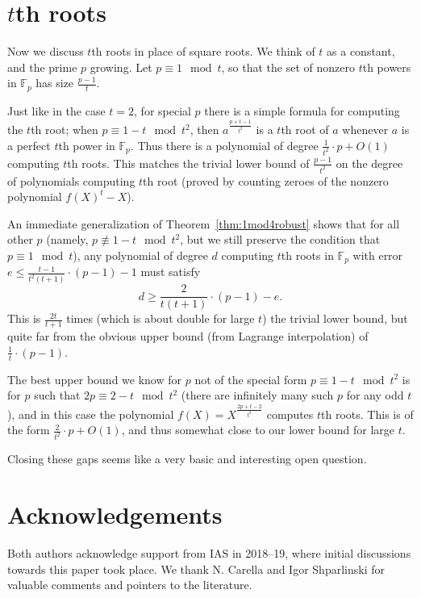 \documentclass{article}
\newcommand{\F}{\mathbb{F}}
\begin{document}
\section{$t$th roots}

Now we discuss $t$th roots in place of square roots. We think of $t$ as a constant, and the prime $p$ growing. Let $p \equiv 1 \mod t$, so that the set of nonzero $t$th powers in $\F_p$ has size $\frac{p-1}{t}$.

Just like in the case $t = 2$, for special $p$ there is a simple formula for computing the $t$th root; when $p \equiv 1-t \mod t^2$, then $a^{\frac{p + t - 1}{t^2}}$ is a $t$th root of $a$ whenever $a$ is a perfect $t$th power in $\F_p$. Thus there is a polynomial of degree $\frac{1}{t^2}\cdot p + O(1)$ computing $t$th roots.
This matches the trivial lower bound of $\frac{p-1}{t^2}$ on the degree of polynomials computing $t$th root (proved by counting zeroes of the nonzero polynomial $f(X)^t - X$).



An immediate generalization of Theorem~\ref{thm:1mod4robust} shows that for all other $p$ (namely, $p \not\equiv 1 - t \mod t^2$, but we still preserve the condition that $p \equiv 1 \mod t$),
any polynomial of degree $d$ computing $t$th roots in $\F_p$ with error $e \leq \frac{t-1}{t^2(t+1)} \cdot (p-1) -1$ must satisfy
$$ d \geq \frac{2}{t (t+1) }\cdot (p-1) - e.$$
This is $\frac{2t}{t+1}$ times (which is about double for large $t$) the trivial lower bound, but quite far from the obvious upper bound (from Lagrange interpolation) of $\frac{1}{t}\cdot (p-1)$.

The best upper bound we know for $p$ not of the special form $p \equiv 1 - t \mod t^2$ is for $p$ such that $2p \equiv 2 - t \mod t^2$ (there are infinitely many such $p$ for any odd $t$), and in this case the polynomial $f(X) = X^{\frac{2p+t-2}{t^2} }$ computes $t$th roots. This is of the form
$\frac{2}{t^2} \cdot p + O(1)$, and thus somewhat close to our lower bound for large $t$.

Closing these gaps seems like a very basic and interesting open question.

\section*{Acknowledgements}

Both authors acknowledge support from IAS in 2018--19, where initial
discussions towards this paper took place. We thank N. Carella and Igor Shparlinski for valuable comments and pointers to the literature.

 

\end{document}
